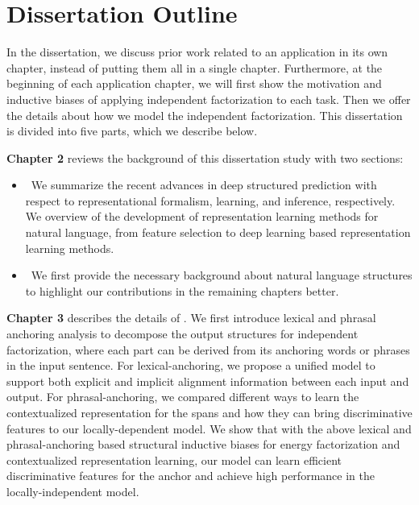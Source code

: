 
\section{Dissertation Outline}
\label{sec:intro:roadmap}

In the dissertation, we discuss prior work related to an application in its
own chapter, instead of putting them all in a single
chapter. Furthermore, at the beginning of each application chapter, we
will first show the motivation and inductive biases of applying
independent factorization to each task. Then we offer the details about
how we model the independent factorization. This dissertation is divided
into five parts, which we describe below.

\textbf{Chapter 2} reviews the background of this dissertation study
with two sections:
\begin{itemize}
\item {}~We summarize
  the recent advances in deep structured prediction with respect to
  representational formalism, learning, and inference, respectively. We
  overview of the development of representation learning methods for
  natural language, from feature selection to deep learning based
  representation learning methods.

\item {}~We first provide the necessary
  background about natural language structures to highlight our contributions in the remaining chapters better.
\end{itemize}

\textbf{Chapter 3} describes the details of . We first introduce
lexical and phrasal anchoring analysis to decompose the output
structures for independent factorization, where each part can be
derived from its anchoring words or phrases in the input sentence. For
lexical-anchoring, we propose a unified model to support both explicit
and implicit alignment information between each input and output. For
phrasal-anchoring, we compared different ways to learn the
contextualized representation for the spans and how they can bring
discriminative features to our locally-dependent model. We show that
with the above lexical and phrasal-anchoring based structural
inductive biases for energy factorization and contextualized
representation learning, our model can learn efficient discriminative
features for the anchor and achieve high performance in the
locally-independent model.

